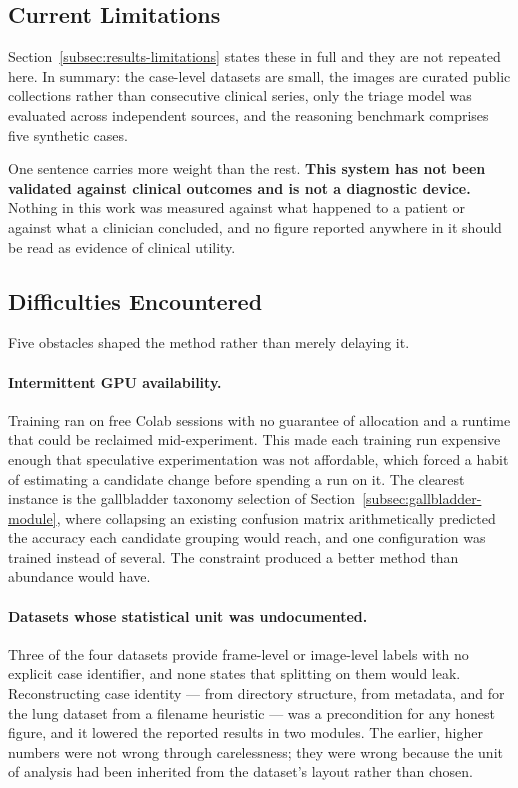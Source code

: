 \subsection{Current Limitations}
\label{subsec:conclusion-limitations}

Section~\ref{subsec:results-limitations} states these in full and they are not repeated here.
In summary: the case-level datasets are small, the images are curated public collections rather
than consecutive clinical series, only the triage model was evaluated across independent
sources, and the reasoning benchmark comprises five synthetic cases.

One sentence carries more weight than the rest. \textbf{This system has not been validated
against clinical outcomes and is not a diagnostic device.} Nothing in this work was measured
against what happened to a patient or against what a clinician concluded, and no figure reported
anywhere in it should be read as evidence of clinical utility.

\subsection{Difficulties Encountered}
\label{subsec:conclusion-difficulties}

Five obstacles shaped the method rather than merely delaying it.

\paragraph{Intermittent GPU availability.} Training ran on free Colab sessions with no
guarantee of allocation and a runtime that could be reclaimed mid-experiment. This made each
training run expensive enough that speculative experimentation was not affordable, which forced
a habit of estimating a candidate change before spending a run on it. The clearest instance is
the gallbladder taxonomy selection of Section~\ref{subsec:gallbladder-module}, where collapsing
an existing confusion matrix arithmetically predicted the accuracy each candidate grouping would
reach, and one configuration was trained instead of several. The constraint produced a better
method than abundance would have.

\paragraph{Datasets whose statistical unit was undocumented.} Three of the four datasets provide
frame-level or image-level labels with no explicit case identifier, and none states that
splitting on them would leak. Reconstructing case identity --- from directory structure, from
metadata, and for the lung dataset from a filename heuristic --- was a precondition for any
honest figure, and it lowered the reported results in two modules. The earlier, higher numbers
were not wrong through carelessness; they were wrong because the unit of analysis had been
inherited from the dataset's layout rather than chosen.

